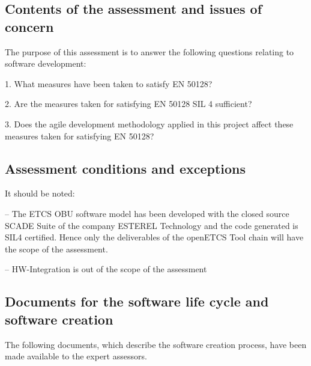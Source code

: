 \bigskip

\subsection{Contents of the assessment and issues of concern}
The purpose of this assessment is to answer the following questions relating to software development:

1. What measures have been taken to satisfy EN 50128?

2. Are the measures taken for satisfying EN 50128 SIL 4 sufficient?

3. Does the agile development methodology applied in this project affect these measures taken for satisfying EN 50128?


\bigskip

\subsection{Assessment conditions and exceptions}
It should be noted:

{}-- The ETCS OBU software model has been developed with the closed source SCADE Suite of the company ESTEREL Technology and the
code generated is SIL4 certified. Hence only the deliverables of the openETCS Tool chain will have the scope of the
assessment.

{}-- HW-Integration is out of the scope of the assessment

\subsection{Documents for the software life cycle
and software creation}
The following documents, which describe the software creation process, have been made available to the expert assessors.


\bigskip


